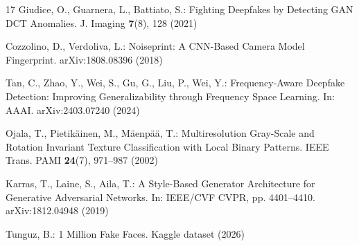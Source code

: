 \documentclass[runningheads]{llncs}
\begin{document}
\begin{thebibliography}{17}
Giudice, O., Guarnera, L., Battiato, S.:
Fighting Deepfakes by Detecting GAN DCT Anomalies.
J. Imaging \textbf{7}(8), 128 (2021)

Cozzolino, D., Verdoliva, L.:
Noiseprint: A CNN-Based Camera Model Fingerprint.
arXiv:1808.08396 (2018)

Tan, C., Zhao, Y., Wei, S., Gu, G., Liu, P., Wei, Y.:
Frequency-Aware Deepfake Detection: Improving Generalizability through Frequency Space Learning.
In: AAAI. arXiv:2403.07240 (2024)

Ojala, T., Pietik\"{a}inen, M., M\"{a}enp\"{a}\"{a}, T.:
Multiresolution Gray-Scale and Rotation Invariant Texture Classification with Local Binary Patterns.
IEEE Trans. PAMI \textbf{24}(7), 971--987 (2002)

Karras, T., Laine, S., Aila, T.:
A Style-Based Generator Architecture for Generative Adversarial Networks.
In: IEEE/CVF CVPR, pp. 4401--4410. arXiv:1812.04948 (2019)

Tunguz, B.:
1 Million Fake Faces. Kaggle dataset (2026)

\end{thebibliography}
\end{document}
